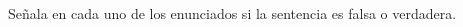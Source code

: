Señala en cada uno de los enunciados si la sentencia es falsa o verdadera.

\begin{multicols}{2}
    \begin{parts}















\end{parts}
\end{multicols}
